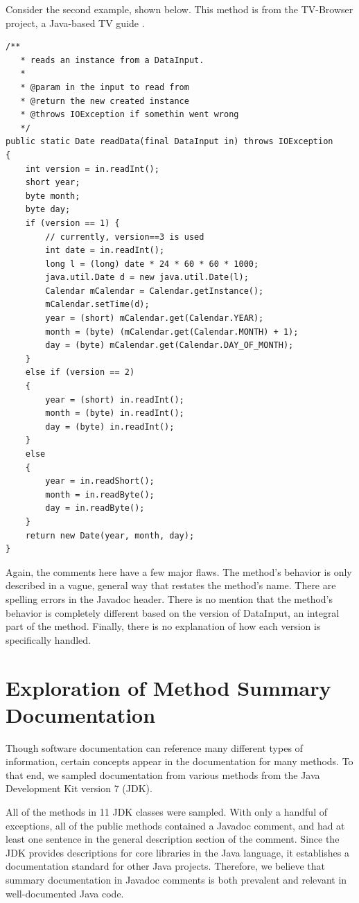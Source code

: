 \documentclass[preprint]{sigplanconf}
\begin{document}
Consider the second example, shown below. This method is from the TV-Browser project, a Java-based TV guide \cite{tvbrowser}.

\begin{lstlisting}
/**
   * reads an instance from a DataInput.
   *
   * @param in the input to read from
   * @return the new created instance
   * @throws IOException if somethin went wrong
   */
public static Date readData(final DataInput in) throws IOException
{
    int version = in.readInt();
    short year;
    byte month;
    byte day;
    if (version == 1) {
        // currently, version==3 is used
        int date = in.readInt();
        long l = (long) date * 24 * 60 * 60 * 1000;
        java.util.Date d = new java.util.Date(l);
        Calendar mCalendar = Calendar.getInstance();
        mCalendar.setTime(d);
        year = (short) mCalendar.get(Calendar.YEAR);
        month = (byte) (mCalendar.get(Calendar.MONTH) + 1);
        day = (byte) mCalendar.get(Calendar.DAY_OF_MONTH);
    }
    else if (version == 2)
    {
        year = (short) in.readInt();
        month = (byte) in.readInt();
        day = (byte) in.readInt();
    }
    else
    {
        year = in.readShort();
        month = in.readByte();
        day = in.readByte();
    }
    return new Date(year, month, day);
}
\end{lstlisting}

Again, the comments here have a few major flaws. The method's behavior is only described in a vague, general way that restates the method's name. There are spelling errors in the Javadoc header. There is no mention that the method's behavior is completely different based on the version of DataInput, an integral part of the method. Finally, there is no explanation of how each version is specifically handled.

\section{Exploration of Method Summary Documentation}
Though software documentation can reference many different types of information, certain concepts appear in the documentation for many methods. To that end, we sampled documentation from various methods from the Java Development Kit version 7 (JDK).

All of the methods in 11 JDK classes were sampled. With only a handful of exceptions, all of the public methods contained a Javadoc comment, and had at least one sentence in the general description section of the comment. Since the JDK provides descriptions for core libraries in the Java language, it establishes a documentation standard for other Java projects. Therefore, we believe that summary documentation in Javadoc comments is both prevalent and relevant in well-documented Java code.
\end{document}
